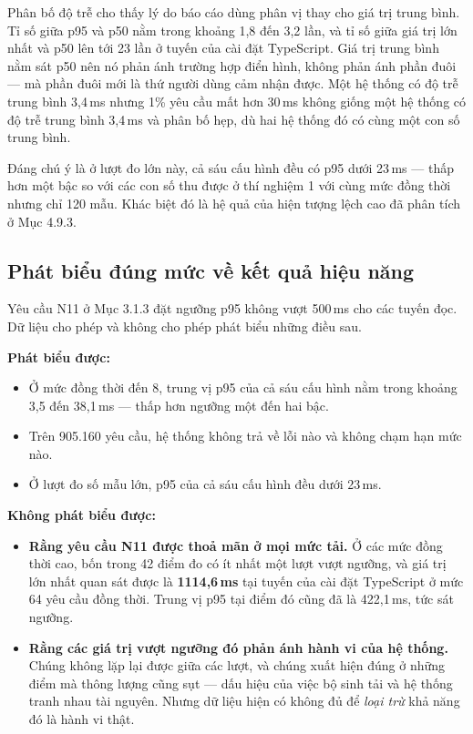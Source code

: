 

Phân bố độ trễ cho thấy lý do báo cáo dùng phân vị thay cho giá trị trung bình. Tỉ số giữa p95 và p50 nằm trong khoảng 1,8 đến 3,2 lần, và tỉ số giữa giá trị lớn nhất và p50 lên tới 23 lần ở tuyến  của cài đặt TypeScript. Giá trị trung bình nằm sát p50 nên nó phản ánh trường hợp điển hình, không phản ánh phần đuôi --- mà phần đuôi mới là thứ người dùng cảm nhận được. Một hệ thống có độ trễ trung bình 3,4\,ms nhưng 1\% yêu cầu mất hơn 30\,ms không giống một hệ thống có độ trễ trung bình 3,4\,ms và phân bố hẹp, dù hai hệ thống đó có cùng một con số trung bình.

Đáng chú ý là ở lượt đo lớn này, cả sáu cấu hình đều có p95 dưới 23\,ms --- thấp hơn một bậc so với các con số thu được ở thí nghiệm 1 với cùng mức đồng thời nhưng chỉ 120 mẫu. Khác biệt đó là hệ quả của hiện tượng lệch cao đã phân tích ở Mục 4.9.3.

\subsection{Phát biểu đúng mức về kết quả hiệu năng}

Yêu cầu N11 ở Mục 3.1.3 đặt ngưỡng p95 không vượt 500\,ms cho các tuyến đọc. Dữ liệu cho phép và không cho phép phát biểu những điều sau.

\noindent \textbf{Phát biểu được:}

\begin{itemize}
    \item Ở mức đồng thời đến 8, trung vị p95 của cả sáu cấu hình nằm trong khoảng 3,5 đến 38,1\,ms --- thấp hơn ngưỡng một đến hai bậc.
    \item Trên 905.160 yêu cầu, hệ thống không trả về lỗi nào và không chạm hạn mức nào.
    \item Ở lượt đo số mẫu lớn, p95 của cả sáu cấu hình đều dưới 23\,ms.
\end{itemize}

\noindent \textbf{Không phát biểu được:}

\begin{itemize}
    \item \textbf{Rằng yêu cầu N11 được thoả mãn ở mọi mức tải.} Ở các mức đồng thời cao, bốn trong 42 điểm đo có ít nhất một lượt vượt ngưỡng, và giá trị lớn nhất quan sát được là \textbf{1114,6\,ms} tại tuyến  của cài đặt TypeScript ở mức 64 yêu cầu đồng thời. Trung vị p95 tại điểm đó cũng đã là 422,1\,ms, tức sát ngưỡng.
    \item \textbf{Rằng các giá trị vượt ngưỡng đó phản ánh hành vi của hệ thống.} Chúng không lặp lại được giữa các lượt, và chúng xuất hiện đúng ở những điểm mà thông lượng cũng sụt --- dấu hiệu của việc bộ sinh tải và hệ thống tranh nhau tài nguyên. Nhưng dữ liệu hiện có không đủ để \emph{loại trừ} khả năng đó là hành vi thật.
\end{itemize}

